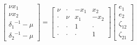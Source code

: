\begin{equation}
\left[\begin{array}{c}
	       \nu x_1        \\
	       \nu x_2        \\
	{\delta_1}^{-1} - \mu \\
	{\delta_2}^{-1} - \mu
\end{array}\right]
=
\left[\begin{array}{cccc}
	 \nu  & \cdot & -x_1  &  x_2  \\
	\cdot &  \nu  &  x_1  & -x_2  \\
	\cdot & \cdot &   1   & \cdot \\
	\cdot & \cdot & \cdot &   1
\end{array}\right]
\left[\begin{array}{c}
	   e_1     \\
	   e_2     \\
	\zeta_{12} \\
	\zeta_{21}
\end{array}\right]
\end{equation}